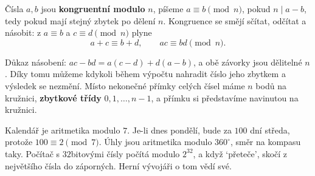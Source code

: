 \begin{definitionbox}
  Čísla $a, b$ jsou \textbf{kongruentní modulo} $n$, píšeme $a\equiv b\pmod{n}$, pokud $n\mid a - b$, tedy pokud mají stejný zbytek po dělení $n$. Kongruence se smějí sčítat, odčítat a násobit: z $a\equiv b$ a $c\equiv d\pmod{n}$ plyne
  \begin{equation*}
    a + c\equiv b + d,\qquad ac\equiv bd\pmod{n}.
  \end{equation*}
\end{definitionbox}

Důkaz násobení: $ac - bd = a(c - d) + d(a - b)$, a obě závorky jsou dělitelné $n$. Díky tomu můžeme kdykoli během výpočtu nahradit číslo jeho zbytkem a výsledek se nezmění. Místo nekonečné přímky celých čísel máme $n$ bodů na kružnici, \textbf{zbytkové třídy} $0, 1, \ldots, n - 1$, a přímku si představíme navinutou na kružnici.

\begin{center}
  \hspace{1.5cm}
\end{center}

Kalendář je aritmetika modulo $7$. Je-li dnes pondělí, bude za $100$ dní středa, protože $100\equiv 2\pmod 7$. Úhly jsou aritmetika modulo $360^\circ$, směr na kompasu taky. Počítač s $32$bitovými čísly počítá modulo $2^{32}$, a když `přeteče', skočí z největšího čísla do záporných. Herní vývojáři o tom vědí své.

